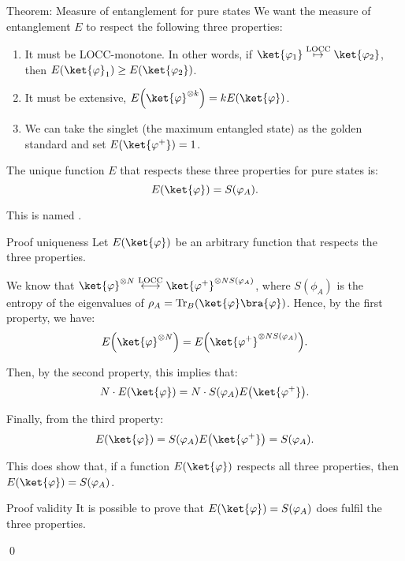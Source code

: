 \documentclass[a4paper]{article}
\begin{document}
\begin{parag}{Theorem: Measure of entanglement for pure states}
    We want the measure of entanglement $E$ to respect the following three properties:
    \begin{enumerate}
        \item It must be LOCC-monotone. In other words, if $\ket{\phi_1} \over{\mapsto}{LOCC} \ket{\phi_2}$, then $E\left(\ket{\phi}_1\right) \geq E\left(\ket{\phi_2}\right)$.
        \item It must be extensive, $E\left(\ket{\phi}^{\otimes k}\right) = k E\left(\ket{\phi}\right)$.
        \item We can take the singlet (the maximum entangled state) as the golden standard and set $E\left(\ket{\phi^+}\right) = 1$.
    \end{enumerate}

    The unique function $E$ that respects these three properties for pure states is:
    \[E\left(\ket{\phi}\right) = S\left(\phi_A\right).\]

    This is named .

    \begin{subparag}{Proof uniqueness}
        Let $E\left(\ket{\phi}\right)$ be an arbitrary function that respects the three properties. 

        We know that $\ket{\phi}^{\otimes N} \over{\longleftrightarrow}{LOCC} \ket{\phi^+}^{\otimes NS\left(\phi_A\right)}$, where $S\left(\phi_A\right)$ is the entropy of the eigenvalues of $\rho_A = \Tr_B\left(\ket{\phi}\bra{\phi}\right)$. Hence, by the first property, we have:
        \[E\left(\ket{\phi}^{\otimes N}\right) = E\left(\ket{\phi^+}^{\otimes N S\left(\phi_A\right)}\right).\]

        Then, by the second property, this implies that: 
        \[N\cdot  E\left(\ket{\phi}\right) = N\cdot  S\left(\phi_A\right) E\left(\ket{\phi^+}\right).\]

        Finally, from the third property: 
        \[E\left(\ket{\phi}\right) = S\left(\phi_A\right) E\left(\ket{\phi^+}\right) = S\left(\phi_A\right).\]

        This does show that, if a function $E\left(\ket{\phi}\right)$ respects all three properties, then $E\left(\ket{\phi}\right) = S\left(\phi_A\right)$.
    \end{subparag}

    \begin{subparag}{Proof validity}
        It is possible to prove that $E\left(\ket{\phi}\right) = S\left(\phi_A\right)$ does fulfil the three properties.
        
        \qed
    \end{subparag}
\end{parag}
\end{document}
